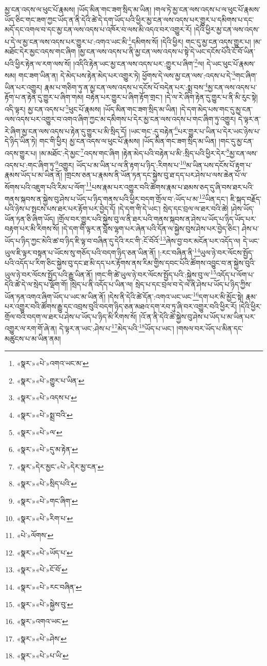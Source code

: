 མྱ་ངན་འདས་ལ་ཕུང་པོ་རྣམས། །ཡོད་མིན་གང་ཟག་སྲིད་མ་ཡིན། །གལ་ཏེ་མྱ་ངན་ལས་འདས་པ་ལ་ཕུང་པོ་རྣམས་ཡོད་ཅིང་གང་ཟག་ཀྱང་ཡོད་ན་ནི་དེའི་ཚེ་དེ་དག་ཡོད་པའི་ཕྱིར་མྱ་ངན་ལས་འདས་པར་གྱུར་པ་དམིགས་པ་དང་མདོ་དང་འགལ་བ་དང་མྱ་ངན་ལས་འདས་པ་འཁོར་བ་ལས་མི་འདའ་བར་འགྱུར་རོ། །དེའི་ཕྱིར་མྱ་ངན་ལས་འདས་པ་དེ་ལ་མྱ་ངན་ལས་འདས་པར་གྱུར་པ་:འགའ་ཡང་མི་\footnote{«སྣར་»«པེ་»འགའ་ཡང་མ་}དམིགས་སོ། །དེའི་ཕྱིར། གང་དུ་མྱ་ངན་འདས་གྱུར་པ། །མ་མཐོང་དེར་མྱང་འདས་གང་ཞིག །མྱ་ངན་ལས་འདས་པ་ནི་མྱ་ངན་ལས་འདས་པ་སྟེ་དེ་ཡང་དངོས་པོའི་ངོ་བོ་ཡིན་པའི་ཕྱིར་རྟེན་ལ་རག་ལས་སོ། །འདིའི་རྟེན་ཡང་མྱ་ངན་ལས་འདས་པར་:གྱུར་པ་ཞིག་\footnote{«སྣར་»«པེ་»གྱུར་པ་ཡིན་}ལ། དེ་ཡང་ཕུང་པོ་རྣམས་སམ། གང་ཟག་ཡིན་ན། དེ་མེད་པས་རྟེན་མེད་པར་འགྱུར་ཏེ། ཕྱོགས་དེ་ལས་མྱ་ངན་ལས་:འདས་པ་དེ་\footnote{«སྣར་»«པེ་»འདས་པ་}གང་ཞིག་ཡིན་པར་འགྱུར། རྣམ་པ་གཅིག་ཏུ་ན་མྱ་ངན་ལས་འདས་པ་དངོས་པོ་བདེན་པར་:སྨྲ་བས་\footnote{«སྣར་»«པེ་»སྨྲ་བའི་}མྱ་ངན་ལས་འདས་པ་རྟོག་པ་ན་རྟེན་དུ་གྱུར་པ་ཞིག་གམ། བརྟེན་པར་གྱུར་པ་ཞིག་རྟོག་གྲང་། །དེ་ལ་རེ་ཞིག་རྟེན་དུ་གྱུར་པ་ནི་མི་རུང་སྟེ། འདི་ལྟར། མྱ་ངན་འདས་པ་\footnote{«སྣར་»«པེ་»ལ་}ཕུང་པོ་རྣམས། །ཡོད་མིན་གང་ཟག་སྲིད་མ་ཡིན། །དེ་དག་མེད་པས་གང་དུ་མྱ་ངན་ལས་འདས་པར་འགྱུར་བ་འགའ་ཞིག་ཀྱང་མ་དམིགས་པ་དེར་མྱ་ངན་ལས་འདས་པ་གང་ཞིག་ཏུ་འགྱུར། དེ་ལྟར་ན་རེ་ཞིག་མྱ་ངན་ལས་འདས་པ་རྟེན་དུ་གྱུར་པ་མི་སྲིད་དོ། །ཡང་གང་:དུ་བརྟེན་\footnote{«སྣར་»«པེ་»དུ་མ་རྟེན་}པར་གྱུར་པ་ཡིན་པ་དེར་ཡང་ཉེས་པ་དེ་ཉིད་ཡིན་ཏེ། གང་གི་ཕྱིར། མྱ་ངན་འདས་ལ་ཕུང་པོ་རྣམས། །ཡོད་མིན་གང་ཟག་སྲིད་མ་ཡིན། །གང་དུ་མྱ་ངན་འདས་གྱུར་པ། །མ་མཐོང་:དེ་མྱང་\footnote{«སྣར་»དེར་མྱང་«པེ་»དེར་མྱ་ངན་}འདས་གང་ཞིག །རྟེན་མེད་པའི་བརྟེན་པ་མི་:སྲིད་པའི་ཕྱིར་དེར་\footnote{«སྣར་»«པེ་»སྲིད་པའི་}མྱ་ངན་ལས་འདས་པ་:གང་ཞིག་ཏུ་\footnote{«སྣར་»«པེ་»གང་ཞིག་}འགྱུར། ཡོད་པ་མ་ཡིན་པ་ལ་ནི་རྟག་པ་ཉིད་:རིགས་པ་\footnote{«སྣར་»«པེ་»རིག་པ་}མ་ཡིན་པས་དངོས་པོ་རྟག་པ་རྣམས་ཡོད་པ་མ་ཡིན་ནོ། །གྲངས་ཅན་པ་རྣམས་ནི་ཡོན་ཏན་དང་སྐྱེས་བུ་ཐ་དད་པར་ཤེས་པ་ལས་ཆེན་པོ་ལ་སོགས་པའི་འཇུག་པའི་རིམ་པ་ལོག་\footnote{«པེ་»ལོགས་}པས་རྣམ་པར་འགྱུར་བའི་ཚོགས་རྣམ་པ་ཐམས་ཅད་དུ་ཞི་བས་ཐར་པའི་གནས་སྐབས་ན་སྐྱེས་བུ་ཤེས་པ་ཡོད་པ་ཉིད་གནས་པའི་ཕྱིར་བདག་གྲོལ་བ་:ཡོད་པ་མ་\footnote{«སྣར་»«པེ་»ཡོད་པ་}ཡིན་དང་། ཇི་སྐད་བརྗོད་པའི་ཉེས་པ་སྤངས་པས་ཐར་པར་རྟོག་པར་བྱེད་དོ། །དེ་དག་གི་དེ་ཡང་། སྲེད་དང་བྲལ་ལ་ཐར་བའི་ཚེ། །ཤེས་ཡོད་ཡོན་ཏན་ཅི་ཞིག་ཡོད། །གྲོལ་བར་གྱུར་པའི་སྐྱེས་བུ་ལ་ནི་ཐར་པའི་གནས་སྐབས་ན་ཤེས་པ་ཡོད་པ་ཉིད་ཡོད་པར་བརྟག་པར་མི་རིགས་སོ། །དེ་དག་གི་ལྟར་ན་བློས་ལྷག་པར་ཞེན་པའི་དོན་ལ་སྐྱེས་བུས་ཤེས་པར་བྱེད་ཅིང་། ཤེས་པ་ཡོད་པ་ཉིད་ཀྱང་མེའི་ཚ་བ་ཉིད་ཇི་ལྟ་བ་བཞིན་དུ་དེའི་རང་གི་:ངོ་བོའོ་\footnote{«སྣར་»«པེ་»ངོ་བོ་}ཞེས་བྱ་བར་མངོན་པར་འདོད་ལ། དེ་ཡང་ཡུལ་ཇི་ལྟར་བསྟན་པ་ཡོངས་སུ་གཅོད་པའི་བདག་ཉིད་ཅན་ཡིན་ནོ། །:རང་བཞིན་ནི་\footnote{«སྣར་»«པེ་»རང་བཞིན་}ཡུལ་ཉེ་བར་ལོངས་སྤྱོད་པའི་འདོད་པ་རིག་ཅིང་སྐྱེས་བུ་དང་ཐ་མི་དད་པར་རྟོགས་ནས་རིམ་གྱིས་དབང་པོའི་ཚོགས་འབྱུང་བ་ན་སྐྱེས་བུའི་ཡུལ་ཉེ་བར་ལོངས་སྤྱོད་པའི་རྒྱུ་ཡིན་ནོ། །གང་གི་ཚེ་ཡུལ་ཉེ་བར་ལོངས་སྤྱོད་པའི་:སྐྱེས་བུ་ལ་\footnote{«སྣར་»«པེ་»སྐྱེས་བུ་}འདོད་པ་ལོག་པ་དེའི་ཚེ་དེ་ལ་སྲེད་པ་ལྡོག་གོ། །སྲེད་པ་ནི་འདོད་པ་ཡིན་ལ། སྲེད་པ་དང་བྲལ་བ་དེ་ལ་ནི་ཤེས་པ་ཡོད་པ་ཉིད་ཀྱིས་ཡོན་ཏན་འགའ་ཞིག་ཡོད་པ་ཡང་མ་ཡིན་ནོ། །དེས་ནི་དེའི་ཚེ་དོན་:འགའ་ཡང་ཡང་\footnote{«སྣར་»འགའ་ཡང་}དག་པར་མི་མྱོང་སྟེ། རྣམ་པར་འགྱུར་བའི་ཚོགས་རྒྱུ་དང་འབྲས་བུའི་བདག་ཉིད་ཅན་མཐའ་དག་རབ་ཏུ་ཞི་བར་འགྱུར་བའི་ཕྱིར་རོ། །དེའི་ཕྱིར་གྲོལ་བའི་བདག་ལ་ཐར་པ་ཤེས་པ་ཡོད་པ་ཉིད་མི་རིགས་སོ། །འོ་ན་ནི་དེའི་ཚེ་སྐྱེས་བུ་ཤེས་པ་ཡོད་པ་མ་ཡིན་པར་འགྱུར་ལ་རག་གོ་ཞེ་ན། དེ་ལྟར་ན་ཡང་:ཤེས་པ་\footnote{«སྣར་»«པེ་»ཤེས་}མེད་པའི་\footnote{«སྣར་»«པེ་»པ་ཡི་}ཡོད་པ་ཡང་། །གསལ་བར་ཡོད་པ་མིན་དང་མཚུངས་པ་མ་ཡིན་ནམ། 